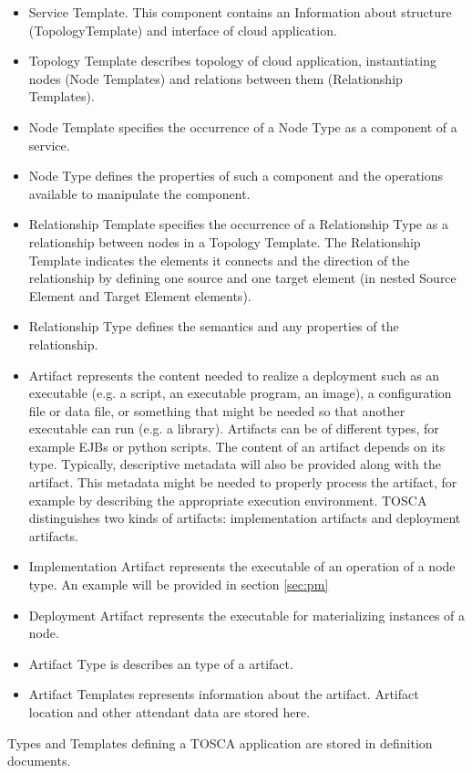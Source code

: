 \begin{itemize}
\item Service Template. 
	This component contains an Information about structure (TopologyTemplate) and interface of cloud application.
\item Topology Template describes topology of cloud application, instantiating nodes (Node Templates) and relations between them (Relationship Templates).
\item Node Template specifies the occurrence of a Node Type as a component of a service.
\item Node Type defines the properties of such a component and the operations available to manipulate the component.
\item Relationship Template specifies the occurrence of a Relationship Type as a relationship between nodes in a Topology Template. 
	The Relationship Template indicates the elements it connects and the direction of the relationship by defining one source and one target element (in nested Source Element and Target Element elements).
\item Relationship Type defines the semantics and any properties of the relationship. 
\item Artifact  represents the content needed to realize a deployment such as an executable (e.g. a script, an executable program, an image), a configuration file or data file, or something that might be needed so that another executable can run (e.g. a library).
	Artifacts can be of different types, for example EJBs or python scripts.
	The content of an artifact depends on its type. 
	Typically, descriptive metadata will also be provided along with the artifact.
	This metadata might be needed to properly process the artifact, for example by describing the appropriate execution environment.
	TOSCA distinguishes two kinds of artifacts: implementation artifacts and deployment artifacts.
\item Implementation Artifact represents the executable of an operation of a node type. An example will be provided in section \ref{sec:pm}
\item Deployment Artifact represents the executable for materializing instances of a node.
\item Artifact Type is describes an type of a artifact.
\item Artifact Templates represents information about the artifact. 
	Artifact location and other attendant data are stored here.
\end{itemize}
Types and Templates defining a TOSCA application are stored in definition documents.

